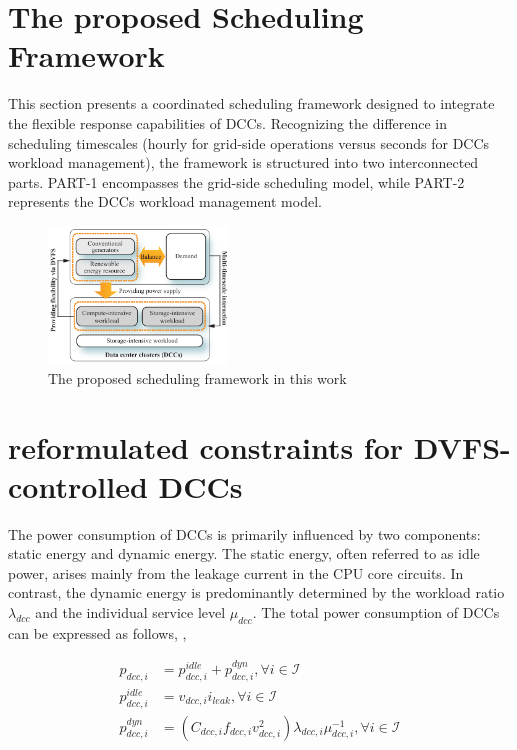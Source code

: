 \documentclass[lettersize,journal]{IEEEtran}
\begin{document}
\section{The proposed Scheduling Framework}

This section presents a coordinated scheduling framework designed to integrate the flexible response capabilities of DCCs. Recognizing the difference in scheduling timescales (hourly for grid-side operations versus seconds for DCCs workload management), the framework is structured into two interconnected parts. PART-1 encompasses the grid-side scheduling model, while PART-2 represents the DCCs workload management model.


\begin{figure}[!h]
    \centering
    \includegraphics[width=0.425\textwidth]{./fig/framework.pdf}\vspace{-0.35cm}
    \caption{The proposed scheduling framework in this work}\vspace{-0.35cm}
    \label{fig:sfr}
  \end{figure}

\vspace{-0.25cm}
\section{reformulated constraints for DVFS-controlled DCCs}

The power consumption of DCCs is primarily influenced by two components: static energy and dynamic energy. The static energy, often referred to as idle power, arises mainly from the leakage current in the CPU core circuits. In contrast, the dynamic energy is predominantly determined by the workload ratio $\lambda_{dcc}$ and the individual service level $\mu_{dcc}$. The total power consumption of DCCs can be expressed as follows, \cite{lin2023workload},

\vspace{-0.25cm}
\begin{subequations}
  \begin{align}
    p_{dcc,i} &= p_{dcc,i}^{idle} + p_{dcc,i}^{dyn},\forall i\in\mathcal{I}\\
    p_{dcc,i}^{idle} &= v_{dcc,i} i_{leak},\forall i\in\mathcal{I}\\
    p_{dcc,i}^{dyn} &= {\left( C_{dcc,i} f_{dcc,i} v_{dcc,i}^{2} \right )}{\lambda_{dcc,i}}{\mu_{dcc,i}^{-1}}, \forall i\in \mathcal{I}
  \end{align}
\end{subequations}
\end{document}
